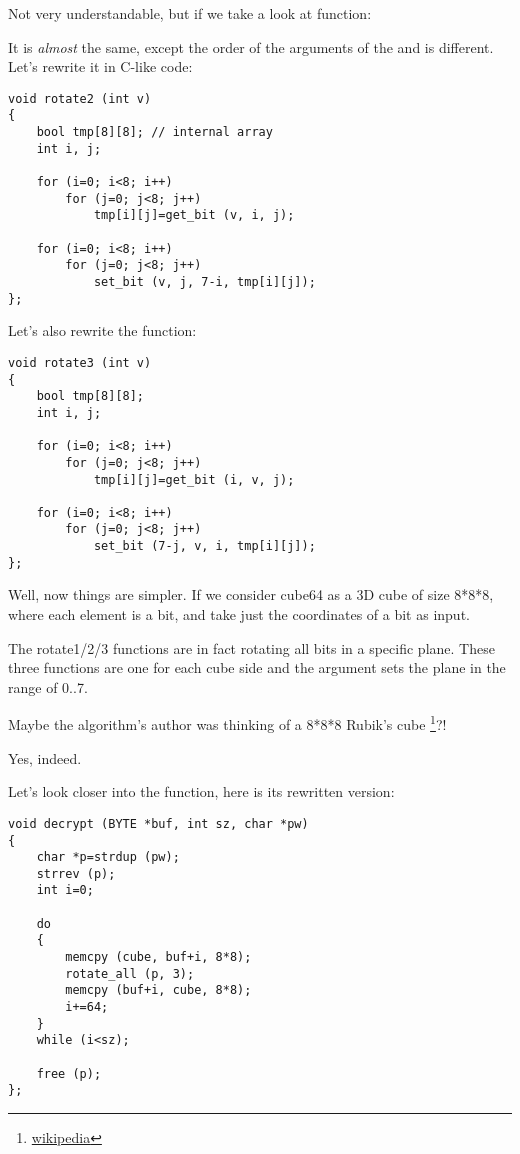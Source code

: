 Not very understandable, but if we take a look at  function:



It is \emph{almost} the same, except the order of the arguments of the  and  is different. 
Let's rewrite it in C-like code:

\begin{lstlisting}[style=customc]
void rotate2 (int v)
{
	bool tmp[8][8]; // internal array
	int i, j;

	for (i=0; i<8; i++)
		for (j=0; j<8; j++)
			tmp[i][j]=get_bit (v, i, j);

	for (i=0; i<8; i++)
		for (j=0; j<8; j++)
			set_bit (v, j, 7-i, tmp[i][j]);
};
\end{lstlisting}

Let's also rewrite the  function:

\begin{lstlisting}[style=customc]
void rotate3 (int v)
{
	bool tmp[8][8];
	int i, j;

	for (i=0; i<8; i++)
		for (j=0; j<8; j++)
			tmp[i][j]=get_bit (i, v, j);

	for (i=0; i<8; i++)
		for (j=0; j<8; j++)
			set_bit (7-j, v, i, tmp[i][j]);
};
\end{lstlisting}

Well, now things are simpler. If we consider cube64 as a 3D cube of size 8*8*8, where each element is a bit, 
 and  take just the coordinates of a bit as input.

The rotate1/2/3 functions are in fact rotating all bits in a specific plane. 
These three functions are one for each cube side and the  argument sets the plane in the range of 0..7.

Maybe the algorithm's author was thinking of a 8*8*8 Rubik's cube
\footnote{\href{http://en.wikipedia.org/wiki/Rubik's_Cube}{wikipedia}}?!

Yes, indeed.

Let's look closer into the  function, here is its rewritten version:

\begin{lstlisting}[style=customc]
void decrypt (BYTE *buf, int sz, char *pw)
{
	char *p=strdup (pw);
	strrev (p);
	int i=0;

	do
	{
		memcpy (cube, buf+i, 8*8);
		rotate_all (p, 3);
		memcpy (buf+i, cube, 8*8);
		i+=64;
	}
	while (i<sz);
	
	free (p);
};
\end{lstlisting}

